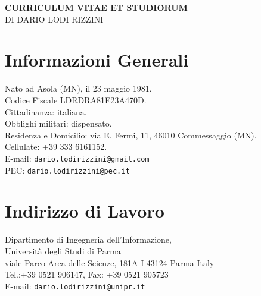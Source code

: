 \documentclass[11pt]{article}
\begin{document}

\nocite{lodirizzini2015ijars, aleotti2014jirs, cigolini2014jamris, lodirizzini2009ras, 
kallasi2015oceans, oleari2015oceans,
aleotti2014iros, oleari2014ifac, lodirizzini2014ias, kallasi2014iarp,
lodirizzini2013ecmr, valeriani2013acra, oleari2013iccp, 
aleotti2012icra, lodirizzini2012icinco, calo2012icinco, 
lodirizzini2011icra, 
lodirizzini2010iros, argenti2010isr, 
lodirizzini2009iros, lodirizzini2009ecmr, lodirizzini2009icar, 
grisetti2008icra, lodirizzini2008ciras, 
lodirizzini2007ecmr, lodirizzini2007icinco, 
%
kallasi2014amra, lodirizzini2012icraworkshop, lodirizzini2010graphbot, lodirizzini2009icraworkshop, cerri2007ccmvs,
%
lodirizzini2008improved,
lodirizzini2009thesis}


\begin{center}
\textbf{\LARGE CURRICULUM VITAE ET STUDIORUM} \\
{\Large DI DARIO LODI RIZZINI}
\end{center}


\section{Informazioni Generali} 

Nato ad Asola (MN), il 23 maggio 1981. \\
Codice Fiscale LDRDRA81E23A470D. \\
Cittadinanza: italiana. \\
Obblighi militari: dispensato. \\
Residenza e Domicilio: via E. Fermi, 11, 46010 Commessaggio (MN). \\
Cellulate: +39 333 6161152. \\
E-mail: \verb|dario.lodirizzini@gmail.com|\\
PEC: \verb|dario.lodirizzini@pec.it|\\

\section*{Indirizzo di Lavoro}

Dipartimento di Ingegneria dell'Informazione,\\
Universit\`a degli Studi di Parma\\
viale Parco Area delle Scienze, 181A I-43124 Parma Italy\\
Tel.:+39 0521 906147, Fax: +39 0521 905723\\
E-mail: \verb|dario.lodirizzini@unipr.it|\\
\end{document}
